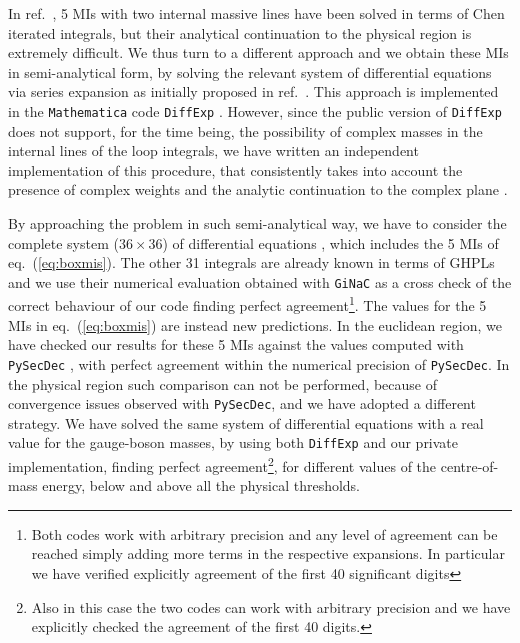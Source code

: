 \documentclass[11pt,a4paper]{article}
\begin{document}
In ref.~\cite{Bonciani:2016ypc}, 5 MIs with two internal massive lines
have been solved in terms of Chen iterated integrals,
but their analytical continuation to
the physical region is extremely difficult.
We thus turn to a different approach and we obtain these MIs in semi-analytical form,
by solving the relevant system of differential equations via series expansion as initially proposed in ref.~\cite{Moriello:2019yhu}.
This approach is implemented in the {\tt Mathematica} code {\tt DiffExp} \cite{Hidding:2020ytt}.
However, since the public version of {\tt DiffExp} does not support, for the time being, the possibility of complex masses in the internal lines of the loop integrals, we have written an independent implementation of this procedure,
that consistently takes into account the presence of complex weights and the analytic continuation to the complex plane \cite{SeaFire}.


%
By approaching the problem in such semi-analytical way,
we have to consider the complete system ($36 \times 36$)
of differential equations \cite{Bonciani:2016ypc},
which includes the 5 MIs of  eq.~(\ref{eq:boxmis}).
The other 31 integrals are already known in terms of GHPLs
and we use their numerical evaluation obtained
with {\tt GiNaC} \cite{Vollinga:2004sn}
as a cross check of the correct behaviour of our code 
finding perfect agreement\footnote{
  Both codes work with arbitrary precision and
  any level of agreement can be reached simply adding more terms in the respective expansions.
In particular we have verified explicitly agreement of the first 40 significant digits }.
The values for the 5 MIs in eq.~(\ref{eq:boxmis}) are instead new predictions.
  In the euclidean region, we have checked our results for these 5 MIs against the values
  computed with {\tt PySecDec} \cite{Borowka:2017idc},
  with perfect agreement within the numerical precision of {\tt PySecDec}.
  In the physical region such comparison can not be performed,
  because of convergence issues observed with {\tt PySecDec},
  and we have adopted a different strategy.  
We have solved the same system of differential equations
with a real value for the gauge-boson masses,
by using both {\tt DiffExp} and our private implementation,
finding perfect agreement\footnote{
Also in this case the two codes can work with arbitrary precision and we have explicitly checked the agreement of the first 40 digits.},
  for different values of the centre-of-mass energy, below and above all the physical thresholds.
\end{document}
